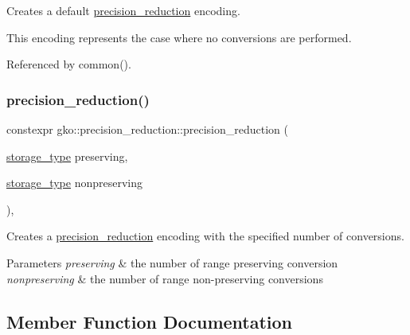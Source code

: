 Creates a default \hyperlink{classgko_1_1precision__reduction}{precision\+\_\+reduction} encoding. 

This encoding represents the case where no conversions are performed. 

Referenced by common().

\mbox{\label{classgko_1_1precision__reduction_ae4d4355a6614ced4fc611619da7b09f2}} 
\subsubsection{\texorpdfstring{precision\+\_\+reduction()}{precision\_reduction()}\hspace{0.1cm}{\footnotesize\ttfamily [2/2]}}
{\footnotesize\ttfamily constexpr gko\+::precision\+\_\+reduction\+::precision\+\_\+reduction (\begin{DoxyParamCaption}\item[{\hyperlink{classgko_1_1precision__reduction_a2a1a94a27fa69b4cc321136b56e7b7d9}{storage\+\_\+type}}]{preserving,  }\item[{\hyperlink{classgko_1_1precision__reduction_a2a1a94a27fa69b4cc321136b56e7b7d9}{storage\+\_\+type}}]{nonpreserving }\end{DoxyParamCaption})\hspace{0.3cm}{\ttfamily [inline]}, {\ttfamily [noexcept]}}



Creates a \hyperlink{classgko_1_1precision__reduction}{precision\+\_\+reduction} encoding with the specified number of conversions. 


\begin{DoxyParams}{Parameters}
{\em preserving} & the number of range preserving conversion \\
\hline
{\em nonpreserving} & the number of range non-\/preserving conversions \\
\hline
\end{DoxyParams}


\subsection{Member Function Documentation}
\mbox{\label{classgko_1_1precision__reduction_ac4109c61fadb24db7a1888c51ac483e9}} 
